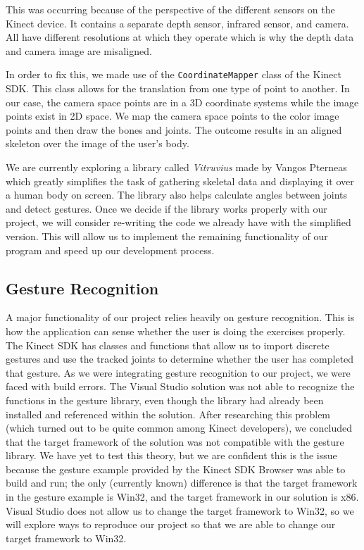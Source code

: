 \documentclass[onecolumn, draftclsnofoot,10pt, compsoc]{IEEEtran}
\begin{document}
This was occurring because of the perspective of the different sensors on the Kinect device. It contains a separate depth sensor, infrared sensor, and camera. All have different resolutions at which they operate which is why the depth data and camera image are misaligned. 

In order to fix this, we made use of the \texttt{CoordinateMapper} class of the Kinect SDK. This class allows for the translation from one type of point to another. In our case, the camera space points are in a 3D coordinate systems while the image points exist in 2D space. We map the camera space points to the color image points and then draw the bones and joints. The outcome results in an aligned skeleton over the image of the user's body. 

We are currently exploring a library called \textit{Vitruvius} made by Vangos Pterneas which greatly simplifies the task of gathering skeletal data and displaying it over a human body on screen. The library also helps calculate angles between joints and detect gestures. Once we decide if the library works properly with our project, we will consider re-writing the code we already have with the simplified version. This will allow us to implement the remaining functionality of our program and speed up our development process.

\subsection{Gesture Recognition}
A major functionality of our project relies heavily on gesture recognition. This is how the application can sense whether the user is doing the exercises properly. The Kinect SDK has classes and functions that allow us to import discrete gestures and use the tracked joints to determine whether the user has completed that gesture. As we were integrating gesture recognition to our project, we were faced with build errors. The Visual Studio solution was not able to recognize the functions in the gesture library, even though the library had already been installed and referenced within the solution. After researching this problem (which turned out to be quite common among Kinect developers), we concluded that the target framework of the solution was not compatible with the gesture library. We have yet to test this theory, but we are confident this is the issue because the gesture example provided by the Kinect SDK Browser was able to build and run; the only (currently known) difference is that the target framework in the gesture example is Win32, and the target framework in our solution is x86. Visual Studio does not allow us to change the target framework to Win32, so we will explore ways to reproduce our project so that we are able to change our target framework to Win32.
\end{document}
